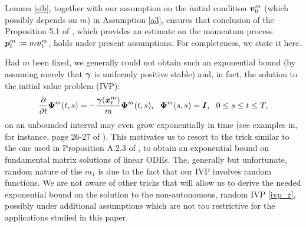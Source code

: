 Lemma \ref{sib}, together with our assumption on the initial condition $\boldsymbol{v}_0^m$ (which possibly depends on $m$) in Assumption \ref{a3}, ensures that conclusion of the Proposition 5.1 of \cite{birrell2017small}, which provides an estimate on the momentum process $\boldsymbol{p}^m_{t} := m \boldsymbol{v}^m_{t}$, holds under present assumptions. For completeness, we state it here.


\begin{remark} \label{diff}
Had $m$ been fixed, we generally could not obtain such an exponential bound (by assuming merely that $\boldsymbol{\gamma}$ is uniformly positive stable) and, in fact, the solution to the initial value problem (IVP): 
\begin{equation} \label{ivp_r} \frac{\partial}{\partial t} \vecc{\Phi}^m(t,s) = -\frac{\vecc{\gamma}(\vecc{x}_t^m)}{m} \vecc{\Phi}^m(t,s), \ \  \vecc{\Phi}^m(s,s) = \vecc{I}, \ \  0 \leq s \leq t \leq T,  \end{equation} 
on an unbounded interval may even grow exponentially in time (see examples in, for instance, page 26-27 of \cite{kabanov2013two}). This motivates us to resort to the trick similar to the one used in Proposition A.2.3 of \cite{kabanov2013two}, to obtain an exponential bound on fundamental matrix solutions of linear ODEs. The, generally but unfortunate, random nature of the  $m_1$ is due to the fact that our IVP involves random functions. We are not aware of other tricks that will allow us to derive the needed exponential bound on the solution to the non-autonomous, random IVP \eqref{ivp_r}, possibly under additional assumptions which are not too restrictive for the applications studied in this paper.
\end{remark}